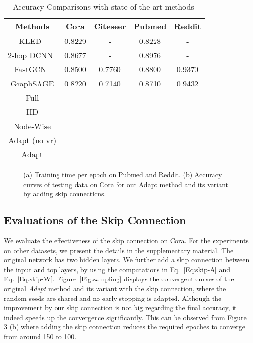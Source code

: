 \documentclass{article}
\begin{document}
\begin{table}[t!]
\centering
\caption{Accuracy Comparisons with state-of-the-art methods.}
\label{Tab:all}
\tabcolsep 1.5pt \renewcommand{\arraystretch}{0.8}
\begin{tabular}{ccccc}
\toprule
Methods          & Cora           & Citeseer        & Pubmed           & Reddit         \\
\hline
KLED~\cite{Fouss06anexperimental}          & 0.8229         &  -              & 0.8228           & -              \\
2-hop DCNN~\cite{atwood2016diffusion}      & 0.8677         &  -              & 0.8976           & -              \\
FastGCN~\cite{chen2018fastgcn}      & 0.8500         &  0.7760         & 0.8800         & 0.9370          \\
GraphSAGE\cite{hamilton2017inductive}     & 0.8220         &  0.7140         & 0.8710         & 0.9432          \\
\hline
Full             &  &   &    &    \\
IID              &  &   &    &                \\
Node-Wise        &  &   &     &                \\
\hline
Adapt (no vr)    &         &         &   &  \\
Adapt   &   &   &   & \\
\bottomrule
\end{tabular}
\end{table}


\begin{figure}[!t]
\begin{center}
\qquad
{}
\caption{(a) Training time per epoch on Pubmed and Reddit. (b) Accuracy curves of testing data on Cora for our Adapt method and its variant by adding skip connections.}
\label{Fig:time}
\end{center}
\end{figure}

\subsection{Evaluations of the Skip Connection}



We evaluate the effectiveness of the skip connection on Cora. For the experiments on other datasets, we present the details in the supplementary material. The original network has two hidden layers. We further add a skip connection between the input and top layers, by using the computations in Eq.~\eqref{Eq:skip-A} and Eq.~\eqref{Eq:skip-W}. Figure~\ref{Fig:sampling} displays the convergent curves of the original \emph{Adapt} method and its variant with the skip connection, where the random seeds are shared and no early stopping is adapted. Although the improvement by our skip connection is not big regarding the final accuracy, it indeed speeds up the convergence significantly. This can be observed from Figure 3 (b) where adding the skip connection reduces the required epoches to converge from around 150 to 100.
\end{document}
